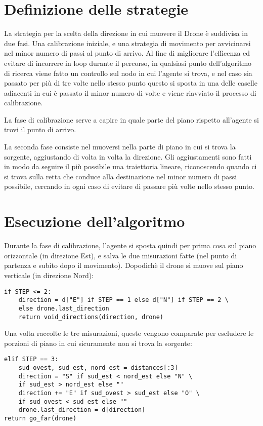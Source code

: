 \section{Definizione delle strategie}
La strategia per la scelta della direzione in cui muovere il Drone è suddivisa in due fasi. Una calibrazione iniziale, e una strategia di movimento per avvicinarsi nel minor numero di passi al punto di arrivo. Al fine di migliorare l'efficenza ed evitare di incorrere in loop durante il percorso, in qualsiasi punto dell'algoritmo di ricerca viene fatto un controllo sul nodo in cui l'agente si trova, e nel caso sia passato per più di tre volte nello stesso punto questo si sposta in una delle caselle adiacenti in cui è passato il minor numero di volte e viene riavviato il processo di calibrazione.

La fase di calibrazione serve a capire in quale parte del piano rispetto all'agente si trovi il punto di arrivo. 

La seconda fase consiste nel muoversi nella parte di piano in cui si trova la sorgente, aggiustando di volta in volta la direzione. Gli aggiustamenti sono fatti in modo da seguire il più possibile una traiettoria lineare, riconoscendo quando ci si trova sulla retta che conduce alla destinazione nel minor numero di passi possibile, cercando in ogni caso di evitare di passare più volte nello stesso punto.
	
\section{Esecuzione dell'algoritmo}
Durante la fase di calibrazione, l'agente si sposta quindi per prima cosa sul piano orizzontale (in direzione Est), e salva le due misurazioni fatte (nel punto di partenza e subito dopo il movimento). Dopodichè il drone si muove sul piano verticale (in direzione Nord): 
\begin{verbatim}
if STEP <= 2:
    direction = d["E"] if STEP == 1 else d["N"] if STEP == 2 \
    else drone.last_direction
    return void_directions(direction, drone)
\end{verbatim}
Una volta raccolte le tre misurazioni, queste vengono comparate per escludere le porzioni di piano in cui sicuramente non si trova la sorgente:
\begin{verbatim}
elif STEP == 3:
    sud_ovest, sud_est, nord_est = distances[:3]
    direction = "S" if sud_est < nord_est else "N" \
    if sud_est > nord_est else ""
    direction += "E" if sud_ovest > sud_est else "O" \
    if sud_ovest < sud_est else ""
    drone.last_direction = d[direction]
return go_far(drone)
\end{verbatim}

